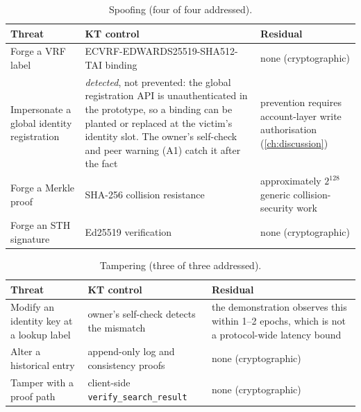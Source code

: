 \begin{table}[ht]
\centering
\caption{Spoofing (four of four addressed).}
\label{tab:stride-s}
\setlength{\extrarowheight}{2pt}
\footnotesize
\setlength{\tabcolsep}{9pt}\renewcommand{\arraystretch}{1.25}
\begin{tabular}{@{}>{\raggedright\arraybackslash}p{4.4cm}>{\raggedright\arraybackslash}p{5.2cm}>{\raggedright\arraybackslash}p{4.0cm}@{}}
\toprule
Threat & KT control & Residual \\
\midrule
Forge a VRF label & ECVRF-EDWARDS25519-SHA512-TAI binding & none (cryptographic) \\
Impersonate a global identity registration & \emph{detected}, not prevented: the global registration API is unauthenticated in the prototype, so a binding can be planted or replaced at the victim's identity slot. The owner's self-check and peer warning (A1) catch it after the fact & prevention requires account-layer write authorisation (\cref{ch:discussion}) \\
Forge a Merkle proof & SHA-256 collision resistance & approximately $2^{128}$ generic collision-security work \\
Forge an STH signature & Ed25519 verification & none (cryptographic) \\
\bottomrule
\end{tabular}
\end{table}

\begin{table}[ht]
\centering
\caption{Tampering (three of three addressed).}
\label{tab:stride-t}
\setlength{\extrarowheight}{2pt}
\footnotesize
\setlength{\tabcolsep}{9pt}\renewcommand{\arraystretch}{1.25}
\begin{tabular}{@{}>{\raggedright\arraybackslash}p{4.4cm}>{\raggedright\arraybackslash}p{5.2cm}>{\raggedright\arraybackslash}p{4.0cm}@{}}
\toprule
Threat & KT control & Residual \\
\midrule
Modify an identity key at a lookup label & owner's self-check detects the mismatch & the demonstration observes this within 1--2 epochs, which is not a protocol-wide latency bound \\
Alter a historical entry & append-only log and consistency proofs & none (cryptographic) \\
Tamper with a proof path & client-side \texttt{verify\_search\_result} & none (cryptographic) \\
\bottomrule
\end{tabular}
\end{table}

